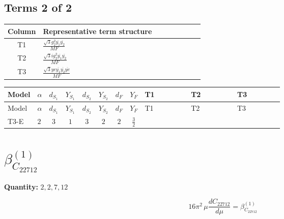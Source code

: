 \documentclass[8pt]{article}
\begin{document}
\begin{landscape}
\subsection*{Terms 2 of 2}
\begin{center}
\begin{tabular}{@{}c >{\raggedright\arraybackslash}p{0.82\linewidth}@{}}
\toprule
Column & Representative term structure \\
\midrule
T1 & \(\displaystyle \frac{\sqrt{3} g_{2}^{2} \overline{y_{1}} \overline{y_{2}}}{MF}\) \\
\midrule
T2 & \(\displaystyle \frac{\sqrt{3} i g_{2}^{2} \overline{y_{1}} \overline{y_{2}}}{MF}\) \\
\midrule
T3 & \(\displaystyle \frac{\sqrt{3} ye \overline{y_{1}} \overline{y_{2}} \overline{ye}}{MF}\) \\
\midrule
\bottomrule
\end{tabular}
\end{center}
\smallskip
\tiny
\begin{longtable}{@{}llcccccc >{\raggedright\arraybackslash}p{0.21\linewidth} >{\raggedright\arraybackslash}p{0.21\linewidth} >{\raggedright\arraybackslash}p{0.21\linewidth}@{}}
\toprule
Model & $\alpha$ & $d_{S_1}$ & $Y_{S_1}$ & $d_{S_2}$ & $Y_{S_2}$ & $d_F$ & $Y_F$ & T1 & T2 & T3 \\
\midrule
\endfirsthead
\toprule
Model & $\alpha$ & $d_{S_1}$ & $Y_{S_1}$ & $d_{S_2}$ & $Y_{S_2}$ & $d_F$ & $Y_F$ & T1 & T2 & T3 \\
\midrule
\endhead
T3-E & $2$ & $3$ & $1$ & $3$ & $2$ & $2$ & $\frac{3}{2}$ & \scriptsize\adjustbox{max width=\linewidth}{$\begin{gathered} \frac{11 \sqrt{3} g_{2}^{2} \overline{y_{1}} \overline{y_{2}}}{8 MF}\end{gathered}$} & \scriptsize\adjustbox{max width=\linewidth}{$\begin{gathered} - \frac{\sqrt{3} i g_{2}^{2} \overline{y_{1}} \overline{y_{2}}}{6 MF}\end{gathered}$} & \scriptsize\adjustbox{max width=\linewidth}{$\begin{gathered} - \frac{\sqrt{3} ye \overline{y_{1}} \overline{y_{2}} \overline{ye}}{12 MF}\end{gathered}$} \\
\midrule
\bottomrule
\end{longtable}
\clearpage
\section*{$\beta_{C_{22712}}^{(1)}$}
\noindent\textbf{Quantity: }$\mathrm{2,2,7,12}$\par\smallskip
\[16\pi^2\,\mu\frac{d C_{22712}}{d\mu}=\beta_{C_{22712}}^{(1)}\]

\end{landscape}
\end{document}
